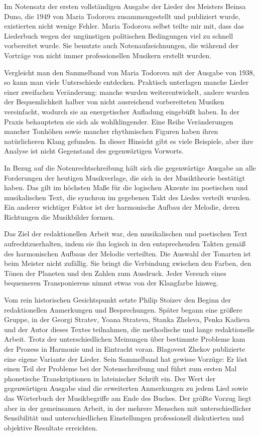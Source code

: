 \documentclass[11pt,a5paper,twoside]{article}
\begin{document}
Im Notensatz der ersten vollständigen Ausgabe der Lieder des Meisters Beinsa Duno, die 1949 von Maria Todorova zusammengestellt und publiziert wurde, existierten nicht wenige Fehler. Maria Todorova selbst teilte mir mit, dass das Liederbuch wegen der ungünstigen politischen Bedingungen viel zu schnell vorbereitet wurde. Sie benutzte auch Notenaufzeichnungen, die während der Vorträge von nicht immer professionellen Musikern erstellt wurden. 

Vergleicht man den Sammelband von Maria Todorova mit der Ausgabe von 1938, so kann man viele Unterschiede entdecken. Praktisch unterlagen manche Lieder einer zweifachen Veränderung: manche wurden weiterentwickelt, andere wurden der Bequemlichkeit halber von nicht ausreichend vorbereiteten Musiken vereinfacht, wodurch sie an energetischer Aufladung eingebüßt haben. In der Praxis behaupteten sie sich als wohlklingender. Eine Reihe Veränderungen mancher Tonhöhen sowie mancher rhythmischen Figuren haben ihren natürlicheren Klang gefunden. In dieser Hinsicht gibt es viele Beispiele, aber ihre Analyse ist nicht Gegenstand des gegenwärtigen Vorworts.

In Bezug auf die Notenrechtschreibung hält sich die gegenwärtige Ausgabe an alle Forderungen der heutigen Musikverlage, die sich in der Musiktheorie bestätigt haben. Das gilt im höchsten Maße für die logischen Akzente im poetischen und musikalischen Text, die synchron im gegebenen Takt des Liedes verteilt wurden. Ein anderer wichtiger Faktor ist der harmonische Aufbau der Melodie, deren Richtungen die Musikbilder formen.

Das Ziel der redaktionellen Arbeit war, den musikalischen und poetischen Text aufrechtzuerhalten, indem sie ihn logisch in den entsprechenden Takten gemäß des harmonischen Aufbaus der Melodie verteilten. Die Auswahl der Tonarten ist beim Meister nicht zufällig. Sie bringt die Verbindung zwischen den Farben, den Tönen der Planeten und den Zahlen zum Ausdruck. Jeder Versuch eines bequemeren Transponierens nimmt etwas von der Klangfarbe hinweg.

Vom rein historischen Gesichtspunkt setzte Philip Stoizev den Beginn der redaktionellen Anmerkungen und Besprechungen. Später begann eine größere Gruppe, in der Georgi Stratev, Yoana Strateva, Stanka Zheleva, Penka Kadieva und der Autor dieses Textes teilnahmen, die methodische und lange redaktionelle Arbeit. Trotz der unterschiedlichen Meinungen über bestimmte Probleme kam der Prozess in Harmonie und in Eintracht voran. Blagovest Zhekov publizierte eine eigene Variante der Lieder. Sein Sammelband hat gewisse Vorzüge: Er löst einen Teil der Probleme bei der Notenschreibung und führt zum ersten Mal phonetische Transkriptionen in lateinischer Schrift ein. Der Wert der gegenwärtigen Ausgabe sind die erweiterten Anmerkungen zu jedem Lied sowie das Wörterbuch der Musikbegriffe am Ende des Buches. Der größte Vorzug liegt aber in der gemeinsamen Arbeit, in der mehrere Menschen mit unterschiedlicher Sensibilität und unterschiedlichen Einstellungen professionell diskutierten und objektive Resultate erreichten.  
\end{document}
